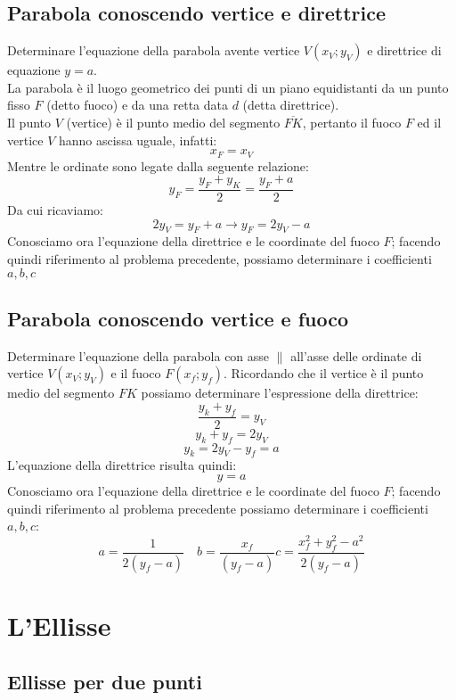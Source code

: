 \documentclass[12pt]{book}
\begin{document}
			\section{Parabola conoscendo vertice e direttrice}
			Determinare l'equazione della parabola avente vertice $V(x_V;y_V)$ e direttrice di equazione $y=a$.
			\\La parabola è il luogo geometrico dei punti di un piano equidistanti da un punto fisso $F$ (detto fuoco) e da una retta data $d$ (detta direttrice).
			\\Il punto $V$ (vertice) è il punto medio del segmento $\overline{FK}$, pertanto il fuoco $F$ ed il vertice $V$ hanno ascissa uguale, infatti:
			\[x_F=x_V\]
			Mentre le ordinate sono legate dalla seguente relazione:
			\[y_F=\frac{y_F+y_K}{2}=\frac{y_F+a}{2}\]
			Da cui ricaviamo:
			\[2y_V=y_F+a\rightarrow y_F=2y_V-a\]
			Conosciamo ora l'equazione della direttrice e le coordinate del fuoco $F$; facendo quindi riferimento al problema precedente, possiamo determinare i coefficienti $a, b, c$
			
			\section{Parabola conoscendo vertice e fuoco}
			Determinare l'equazione della parabola con asse $\parallel$ all'asse delle ordinate di vertice $V(x_V;y_V)$ e il fuoco $F(x_f;y_f)$.
			Ricordando che il vertice è il punto medio del segmento $FK$ possiamo determinare l'espressione della direttrice:
			\[\frac{y_k+y_f}{2}=y_V\]
			\[y_k+y_f=2y_V\]
			\[y_k=2y_V-y_f=a\]
			L'equazione della direttrice risulta quindi:
			\[y=a\]
			Conosciamo ora l'equazione della direttrice e le coordinate del fuoco $F$; facendo quindi riferimento al problema precedente possiamo determinare i coefficienti $a, b, c$:
			\[a=\frac{1}{2\left(y_f-a\right) }\quad
			b=\frac{x_f}{\left(y_f-a\right)}
			c=\frac{x_f^2+y_f^2-a^2}{2\left(y_f-a\right)}\]
	\chapter{L'Ellisse}
			\section{Ellisse per due punti}
			
\end{document}
